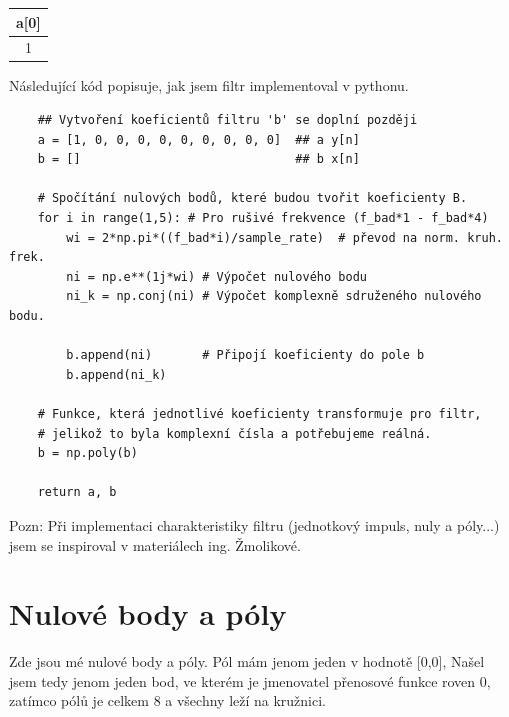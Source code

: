 \documentclass[a4paper, 11pt]{article}
\begin{document}
\begin{table}[ht]
    \centering
    \begin{tabular}{| c |}
    \hline
        a[0] \\ \hline
         1    \\ \hline
    \end{tabular}
\end{table}




Následující kód popisuje, jak jsem filtr implementoval v pythonu.
\begin{verbatim}
    ## Vytvoření koeficientů filtru 'b' se doplní později
    a = [1, 0, 0, 0, 0, 0, 0, 0, 0, 0]  ## a y[n]
    b = []                              ## b x[n]
    
    # Spočítání nulových bodů, které budou tvořit koeficienty B.
    for i in range(1,5): # Pro rušivé frekvence (f_bad*1 - f_bad*4)
        wi = 2*np.pi*((f_bad*i)/sample_rate)  # převod na norm. kruh. frek.
        ni = np.e**(1j*wi) # Výpočet nulového bodu
        ni_k = np.conj(ni) # Výpočet komplexně sdruženého nulového bodu.

        b.append(ni)       # Připojí koeficienty do pole b
        b.append(ni_k)

    # Funkce, která jednotlivé koeficienty transformuje pro filtr,
    # jelikož to byla komplexní čísla a potřebujeme reálná.
    b = np.poly(b)         

    return a, b
\end{verbatim}

Pozn: Při implementaci charakteristiky filtru (jednotkový impuls, nuly a póly...) jsem se inspiroval v materiálech ing. Žmolikové.



\section{Nulové body a póly}
Zde jsou mé nulové body a póly. Pól mám jenom jeden v hodnotě [0,0], Našel jsem tedy jenom jeden bod, ve kterém je jmenovatel přenosové funkce roven 0, zatímco pólů je celkem 8 a všechny leží na kružnici.
\end{document}
